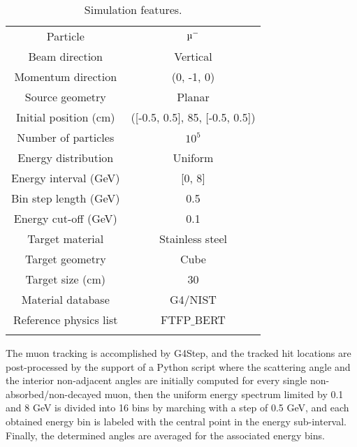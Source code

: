 \documentclass[10.75pt]{article}
\begin{document}
\begin{table}[H]
\begin{center}
\begin{footnotesize}
\caption{Simulation features.}
\begin{tabular}{c c}
\toprule
\toprule
Particle & $\mbox{\textmu}^{-}$\\
Beam direction & Vertical\\
Momentum direction & (0, -1, 0)\\
Source geometry & Planar\\
Initial position (cm) & ([-0.5, 0.5], 85, [-0.5, 0.5])\\
Number of particles & $10^{5}$\\
Energy distribution & Uniform\\
Energy interval (GeV) & [0, 8]\\
Bin step length (GeV) & 0.5\\
Energy cut-off (GeV) & 0.1\\
Target material & Stainless steel\\
Target geometry & Cube\\
Target size (cm) & 30\\ 
Material database & G4/NIST\\
Reference physics list & FTFP$\_$BERT\\
\bottomrule
\bottomrule
\label{features}
\end{tabular}
\end{footnotesize}
\end{center}
\end{table}
\vskip -0.25cm
The muon tracking is accomplished by G4Step, and the tracked hit locations are post-processed by the support of a Python script where the scattering angle and the interior non-adjacent angles are initially computed for every single non-absorbed/non-decayed muon, then the uniform energy spectrum limited by 0.1 and 8 GeV is divided into 16 bins by marching with a step of 0.5 GeV, and each obtained energy bin is labeled with the central point in the energy sub-interval. Finally, the determined angles are averaged for the associated energy bins.
\end{document}
